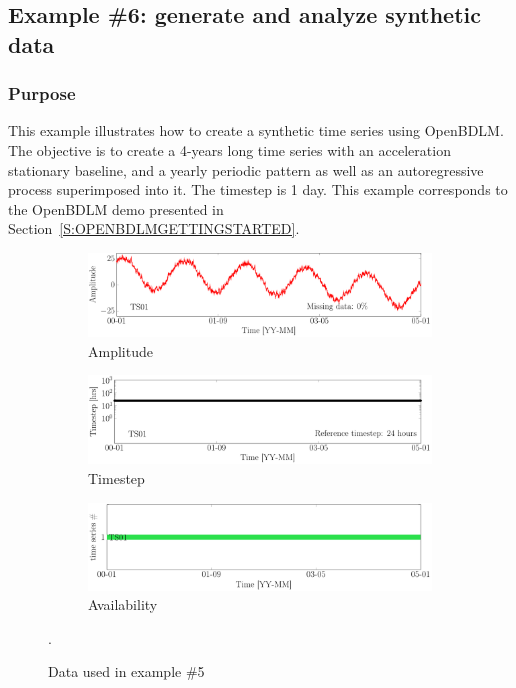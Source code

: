 \subsection{Example \#6: generate and analyze synthetic data }
\label{S:EXAMPLESYNTHETICDATA}


\subsubsection{Purpose}
This example illustrates how to create a synthetic time series using OpenBDLM.
The objective is to create a 4-years long time series with an acceleration stationary baseline, and a yearly periodic pattern as well as an autoregressive process superimposed into it. 
The timestep is 1 day.
This example corresponds to the OpenBDLM demo presented in Section~\ref{S:OPENBDLMGETTINGSTARTED}.

\begin{figure}[h!]
\centering
\begin{subfigure}{\linewidth}\centering
\includegraphics[width=0.9\linewidth]{./docfigs/Example_SYNTHETIC/optim_param_optim_initialhiddenstate/ALL_AMPLITUDES.pdf} 
\caption{Amplitude}
\end{subfigure}
\begin{subfigure}{\linewidth}\centering
\includegraphics[width=0.9\linewidth]{./docfigs/Example_SYNTHETIC/raw/ALL_TIMESTEPS.pdf}
\caption{Timestep}
\end{subfigure}
\begin{subfigure}{\linewidth}\centering
\includegraphics[width=0.9\linewidth]{./docfigs/Example_SYNTHETIC/raw/AVAILABILITY.pdf}
\caption{Availability}
\end{subfigure}
\caption{Data used in example \#5}.
\label{fig:DataSummaryRawSynthetic}
\end{figure}


